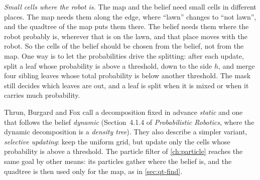 \emph{Small cells where the robot is.} The map and the belief need small
cells in different places. The map needs them along the edge, where
``lawn'' changes to ``not lawn'', and the quadtree of the map puts them
there. The belief needs them where the robot probably is, wherever that
is on the lawn, and that place moves with the robot. So the cells of the
belief should be chosen from the belief, not from the map. One way is to let the
probabilities drive the splitting: after each update, split a leaf whose
probability is above a threshold, down to the side $h$, and merge four
sibling leaves whose total probability is below another threshold. The mask still decides which leaves are out, and a leaf is split when it
is mixed or when it carries much probability.

Thrun, Burgard and Fox call a
decomposition fixed in advance \emph{static} and one that follows the
belief \emph{dynamic} (Section~4.1.4 of \emph{Probabilistic Robotics},
where the dynamic decomposition is a \emph{density tree}). They also
describe a simpler variant, \emph{selective updating}: keep the uniform
grid, but update only the cells whose probability is above a threshold.
The
particle filter of \cref{ch:particle} reaches the same goal by other
means: its particles gather where the belief is, and the quadtree is then
used only for the map, as in \cref{sec:qt-find}.
